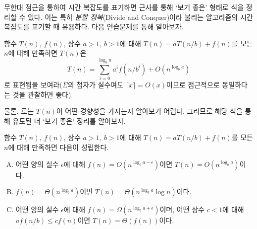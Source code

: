 무한대 점근을 통하여 시간 복잡도를 표기하면 근사를 통해 `보기 좋은' 형태로 식을 정리할 수 있다. 이는 특히 \textit{분할 정복}(Divide and Conquer)이라 불리는 알고리즘의 시간 복잡도를 표기할 때 유용하다. 다음 연습문제를 통해 알아보자.
\begin{exercise}
    함수 $T(n),\ f(n)$, 상수 $a>1,\ b>1$에 대해 $T(n)=aT(n/b)+f(n)$를 모든 $n$에 대해 만족하면 $T(n)$은
    \begin{equation}\label{eq:mastereq}
        T(n)=\sum_{i=0}^{\log_b n}a^i f(n/b^i) +O(n^{\log_b a})
    \end{equation}
    로 표현됨을 보여라($\Sigma$의 첨자가 실수여도 $\lceil x\rceil=O(x)$이므로 점근적으로 동일하다는 것을 관찰하면 좋다).
\end{exercise}
물론, 로는 $T(n)$이 어떤 경향성을 가지는지 알아보기 어렵다. 그러므로 해당 식을 통해 유도된 더 `보기 좋은' 정리를 알아보자.
\begin{theorem}\label{thm:master}
    함수 $T(n),\ f(n)$, 상수 $a>1,\ b>1$에 대해 $T(n)=aT(n/b)+f(n)$를 모든 $n$에 대해 만족하면 다음이 성립한다.
    \begin{enumerate}[(A)]
        \item\label{item:mcase1} 어떤 양의 실수 $\epsilon$에 대해 $f(n)=O(n^{\log_b a-\epsilon})$이면 $T(n)=O(n^{\log_b a})$이다.
        \item\label{item:mcase2} $f(n)=\Theta(n^{\log_b a})$이면 $T(n)=\Theta(n^{\log_b a}\log n)$이다.
        \item\label{item:mcase3} 어떤 양의 실수 $\epsilon$에 대해 $f(n)=\Omega(n^{\log_b a+\epsilon})$이며, 어떤 상수 $c<1$에 대해 $af(n/b)\leq cf(n)$이면 $T(n)=\Theta(f(n))$이다.
    \end{enumerate}
\end{theorem}
